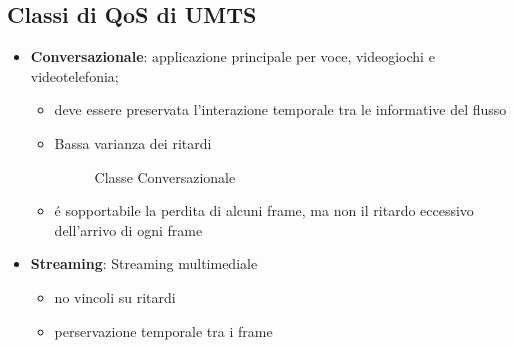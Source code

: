 \documentclass{article}
\begin{document}
\begin{samepage}
    \subsection{Classi di QoS di UMTS}
    \begin{itemize}
        \item \textbf{Conversazionale}: applicazione principale per voce, videogiochi e videotelefonia;
            \begin{itemize}
                \item deve essere preservata l'interazione temporale tra le informative del flusso
                \item Bassa varianza dei ritardi

                    \begin{figure}[h]
                        \centering


                        \caption{Classe Conversazionale}
                    \end{figure}
                \item \'e sopportabile la perdita di alcuni frame, ma non il ritardo eccessivo dell'arrivo di ogni frame

            \end{itemize}

        \item \textbf{Streaming}: Streaming multimediale
            \begin{itemize}
                \item no vincoli su ritardi
                \item perservazione temporale tra i frame


\end{itemize}
\end{itemize}
\end{samepage}
\end{document}
